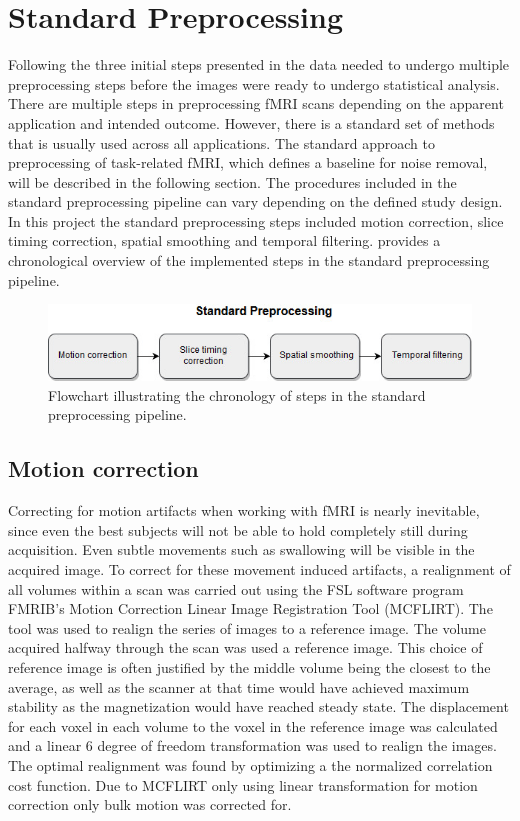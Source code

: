 \section{Standard Preprocessing} \label{sec:std}

Following the three initial steps presented in  the data needed to undergo multiple preprocessing steps before the images were ready to undergo statistical analysis. There are multiple steps in preprocessing fMRI scans depending on the apparent application and intended outcome. However, there is a standard set of methods that is usually used across all applications. \cite{Moayedi2018} The standard approach to preprocessing of task-related fMRI, which defines a baseline for noise removal, will be described in the following section. The procedures included in the standard preprocessing pipeline can vary depending on the defined study design. In this project the standard preprocessing steps included motion correction, slice timing correction, spatial smoothing and temporal filtering.  provides a chronological overview of the implemented steps in the standard preprocessing pipeline.      

\begin{figure}[H]                 
	\includegraphics[width=.7\textwidth]{figures/bMethods/Standard_preprocessing} 
	\caption{Flowchart illustrating the chronology of steps in the standard preprocessing pipeline.}
	\label{fig:meth:std} 
\end{figure}

\subsection{Motion correction}

Correcting for motion artifacts when working with fMRI is nearly inevitable, since even the best subjects will not be able to hold completely still during acquisition. Even subtle movements such as swallowing will be visible in the acquired image. \cite{Poldrack2011} To correct for these movement induced artifacts, a realignment of all volumes within a scan was carried out using the FSL software program FMRIB's Motion Correction Linear Image Registration Tool (MCFLIRT). \cite{Jenkinson2002}
The tool was used to realign the series of images to a reference image. The volume acquired halfway through the scan was used a reference image. This choice of reference image is often justified by the middle volume being the closest to the average, as well as the scanner at that time would have achieved maximum stability as the magnetization would have reached steady state. \cite{Poldrack2011} The displacement for each voxel in each volume to the voxel in the reference image was calculated and a linear 6 degree of freedom transformation was used to realign the images. The optimal realignment was found by optimizing a the normalized correlation cost function. Due to MCFLIRT only using linear transformation for motion correction only bulk motion was corrected for. \cite{Jenkinson2002}


